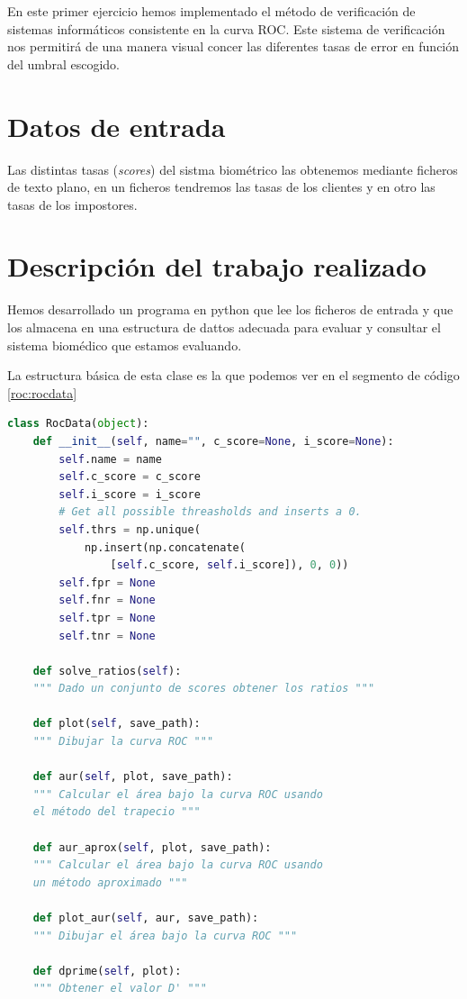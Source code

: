 En este primer ejercicio hemos implementado el método de verificación de sistemas informáticos consistente en la curva ROC. 
Este sistema de verificación nos permitirá de una manera visual concer las diferentes tasas de error en función del umbral escogido.\par

\section{Datos de entrada}
Las distintas tasas (\textit{scores}) del sistma biométrico las obtenemos mediante ficheros de texto plano, en un ficheros tendremos las tasas de los clientes y en otro las tasas de los impostores.\par


\section{Descripción del trabajo realizado}
Hemos desarrollado un programa en python que lee los ficheros de entrada y que los almacena en una estructura de dattos adecuada para evaluar y consultar el sistema biomédico que estamos evaluando.\par
La estructura básica de esta clase es la que podemos ver en el segmento de código \ref{roc:rocdata}

\begin{lstlisting}[language=python,label=roc:rocdata,caption=EDA con la que gestionar la curva ROC]
class RocData(object):
    def __init__(self, name="", c_score=None, i_score=None):
        self.name = name
        self.c_score = c_score
        self.i_score = i_score
        # Get all possible threasholds and inserts a 0.
        self.thrs = np.unique(
            np.insert(np.concatenate(
                [self.c_score, self.i_score]), 0, 0))
        self.fpr = None
        self.fnr = None
        self.tpr = None
        self.tnr = None

    def solve_ratios(self):
    """ Dado un conjunto de scores obtener los ratios """

    def plot(self, save_path):
    """ Dibujar la curva ROC """

    def aur(self, plot, save_path):
    """ Calcular el área bajo la curva ROC usando 
    el método del trapecio """

    def aur_aprox(self, plot, save_path):
    """ Calcular el área bajo la curva ROC usando 
    un método aproximado """

    def plot_aur(self, aur, save_path):
    """ Dibujar el área bajo la curva ROC """    
    
    def dprime(self, plot):
    """ Obtener el valor D' """

\end{lstlisting}

